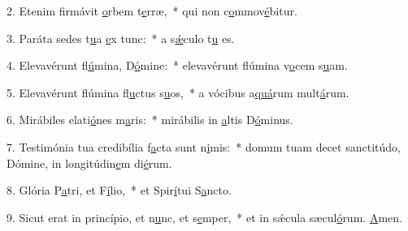 2. Etenim firmávit \uline{o}rbem t\uline{e}rræ,~* qui non c\uline{o}mmov\uline{é}bitur.\par 
3. Paráta sedes t\uline{u}a \uline{e}x tunc:~* a s\uline{ǽ}culo t\uline{u} es.\par 
4. Elevavérunt fl\uline{ú}mina, D\uline{ó}mine:~* elevavérunt flúmina v\uline{o}cem s\uline{u}am.\par 
5. Elevavérunt flúmina fl\uline{u}ctus s\uline{u}os,~* a vócibus a\uline{quá}rum mult\uline{á}rum.\par 
6. Mirábiles elati\uline{ó}nes m\uline{a}ris:~* mirábilis in \uline{a}ltis D\uline{ó}minus.\par 
7. Testimónia tua credibília f\uline{a}cta sunt n\uline{i}mis:~* domum tuam decet sanctitúdo, Dómine, in longitúdin\uline{e}m di\uline{é}rum.\par 
8. Glória P\uline{a}tri, et F\uline{í}lio,~* et Spir\uline{í}tui S\uline{a}ncto.\par 
9. Sicut erat in princípio, et n\uline{u}nc, et s\uline{e}mper,~* et in sǽcula sæcul\uline{ó}rum. \uline{A}men.\par 
